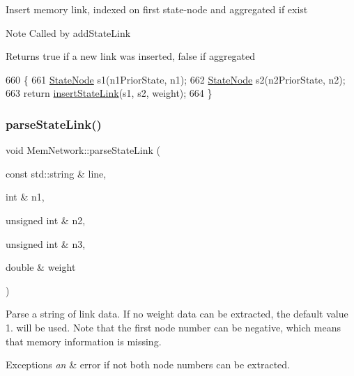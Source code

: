 Insert memory link, indexed on first state-\/node and aggregated if exist \begin{DoxyNote}{Note}
Called by add\+State\+Link 
\end{DoxyNote}
\begin{DoxyReturn}{Returns}
true if a new link was inserted, false if aggregated 
\end{DoxyReturn}

\begin{DoxyCode}
660 \{
661     \mbox{\hyperlink{structStateNode}{StateNode}} s1(n1PriorState, n1);
662     \mbox{\hyperlink{structStateNode}{StateNode}} s2(n2PriorState, n2);
663     \textcolor{keywordflow}{return} \mbox{\hyperlink{classMemNetwork_a57ed428085242fe3d0538a97f52f174d}{insertStateLink}}(s1, s2, weight);
664 \}
\end{DoxyCode}
\mbox{\label{classMemNetwork_acb0405c84f7e3e436867da1673ea7611}} 
\subsubsection{\texorpdfstring{parse\+State\+Link()}{parseStateLink()}}
{\footnotesize\ttfamily void Mem\+Network\+::parse\+State\+Link (\begin{DoxyParamCaption}\item[{const std\+::string \&}]{line,  }\item[{int \&}]{n1,  }\item[{unsigned int \&}]{n2,  }\item[{unsigned int \&}]{n3,  }\item[{double \&}]{weight }\end{DoxyParamCaption})\hspace{0.3cm}{\ttfamily [protected]}}

Parse a string of link data. If no weight data can be extracted, the default value 1. will be used. Note that the first node number can be negative, which means that memory information is missing. 
\begin{DoxyExceptions}{Exceptions}
{\em an} & error if not both node numbers can be extracted. \\
\hline
\end{DoxyExceptions}

